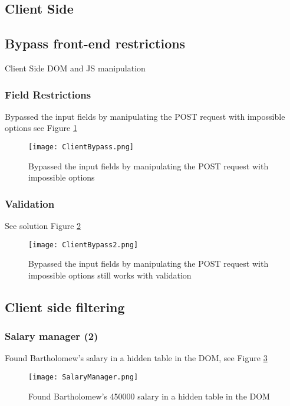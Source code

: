 \documentclass[
	letterpaper, %
	10pt, %
	unnumberedsections, %
	twoside, %
]{APAAssignment}
\begin{document}
\begin{appendices}
\section{Client Side}\label{app:ClientSide}

\subsection{Bypass front-end restrictions}
Client Side DOM and JS manipulation

\subsubsection{Field Restrictions}
Bypassed the input fields by manipulating the POST request with impossible options see Figure \ref{fig:app:ClientBypass} 

\begin{figure}[!htp] %
	\centering
	\texttt{[image: ClientBypass.png]}
	\caption{Bypassed the input fields by manipulating the POST request with impossible options}
	\label{fig:app:ClientBypass}
\end{figure}

\subsubsection{Validation}
See solution Figure \ref{fig:app:ClientBypass2}

\begin{figure}[!htp] %
	\centering
	\texttt{[image: ClientBypass2.png]}
	\caption{Bypassed the input fields by manipulating the POST request with impossible options still works with validation}
	\label{fig:app:ClientBypass2}
\end{figure}

\subsection{Client side filtering}
\subsubsection{Salary manager (2)}
Found Bartholomew's salary in a hidden table in the DOM, see Figure \ref{fig:app:SalaryManager}

\begin{figure}[!htp] %
	\centering
	\texttt{[image: SalaryManager.png]}
	\caption{Found Bartholomew's 450000 salary in a hidden table in the DOM}
	\label{fig:app:SalaryManager}
\end{figure}


\end{appendices}
\end{document}

